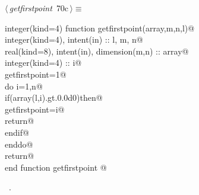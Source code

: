 \documentclass[10pt,a4paper,notitlepage]{article}
\begin{document}
\begin{flushleft} \small
\begin{minipage}{\linewidth}\label{scrap78}\raggedright\small
{} $\langle\,${\it getfirstpoint}\nobreak\ {\footnotesize {70c}}$\,\rangle\equiv$
\vspace{-1ex}
\begin{list}{}{} \item
\mbox{}\verb@      integer(kind=4) function getfirstpoint(array,m,n,l)@\\
\mbox{}\verb@      integer(kind=4), intent(in) :: l, m, n@\\
\mbox{}\verb@      real(kind=8), intent(in), dimension(m,n) :: array@\\
\mbox{}\verb@      integer(kind=4) :: i@\\
\mbox{}\verb@      getfirstpoint=1@\\
\mbox{}\verb@      do i=1,n@\\
\mbox{}\verb@       if(array(l,i).gt.0.0d0)then@\\
\mbox{}\verb@        getfirstpoint=i@\\
\mbox{}\verb@        return@\\
\mbox{}\verb@       endif@\\
\mbox{}\verb@      enddo@\\
\mbox{}\verb@      return@\\
\mbox{}\verb@      end function getfirstpoint                                             @{\NWsep}
\end{list}
\vspace{-1.5ex}
\footnotesize
\begin{list}{}{\setlength{\itemsep}{-\parsep}\setlength{\itemindent}{-\leftmargin}}
\item \NWtxtMacroRefIn\ .

\item{}
\end{list}
\end{minipage}\vspace{4ex}
\end{flushleft}
\end{document}
